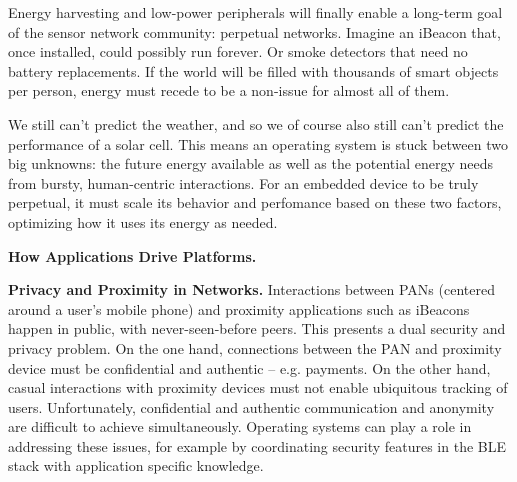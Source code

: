Energy harvesting and low-power peripherals will finally enable a
long-term goal of the sensor network community: perpetual networks. Imagine
an iBeacon that, once installed, could possibly run forever. Or smoke detectors that need no battery replacements. If the world will be filled with
thousands of smart objects per person, energy must recede to be a non-issue
for almost all of them.

We still can't predict the weather, and so we of course also still can't 
predict the performance of a solar cell. This means an operating system
is stuck between two big unknowns: the future energy available as well as
the potential energy needs from bursty, human-centric interactions. For
an embedded device to be truly perpetual, it must scale its behavior and
perfomance based on these two factors, optimizing how it uses its energy
as needed. 


\sub


\smallskip\noindent
\textbf{How Applications Drive Platforms.}

\glipsum[1]

\smallskip\noindent
\textbf{Privacy and Proximity in Networks.}
Interactions between PANs (centered around a user’s mobile phone)
and proximity applications such as iBeacons happen in public, with
never-seen-before peers. This presents a dual security and privacy problem. On
the one hand, connections between the PAN and proximity device must be
confidential and authentic -- e.g. payments.
On the other hand, casual interactions with
proximity devices must not enable ubiquitous tracking of users. Unfortunately,
confidential and authentic communication and anonymity are difficult to
achieve simultaneously.
%
Operating systems can play a role in addressing these issues, for example by coordinating
security features in the BLE stack with application specific knowledge.

%

